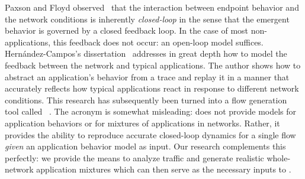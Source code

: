\documentclass[twocolumn,final]{svjour3}
\begin{document}
Paxson and Floyd observed~\cite{Paxson95} that the interaction between endpoint behavior and the network conditions is inherently \textit{closed-loop} in the sense that the emergent behavior is governed by a closed feedback loop.
In the case of most non- applications, this feedback does not occur: an open-loop model suffices.
Hern\'andez-Campos's dissertation~\cite{Hernandez06:dissertation} addresses in great depth how to model the feedback between the network and typical  applications.
The author shows how to abstract an application's behavior from a  trace and replay it in a manner that accurately reflects how typical applications react in response to different network conditions.
This research has subsequently been turned into a  flow generation tool called \tmix~\cite{Weigle06}.
The acronym is somewhat misleading: {\tmix} does not provide models for application behaviors or for mixtures of applications in networks.
Rather, it provides the ability to reproduce accurate closed-loop dynamics for a single  flow \emph{given} an application behavior model as input.
Our research complements this perfectly: we provide the means to analyze traffic and generate realistic whole-network application mixtures which can then serve as the necessary inputs to {\tmix}.

\end{document}

